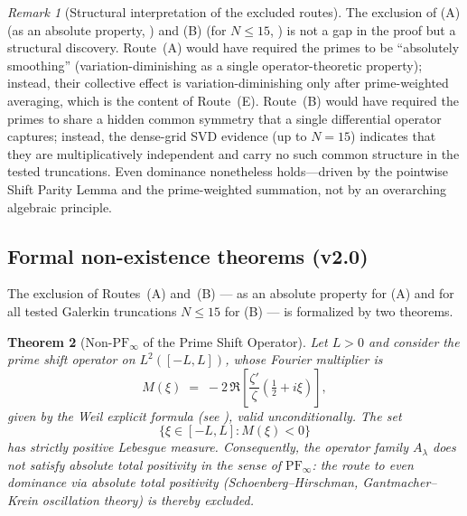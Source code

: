 \documentclass[12pt,a4paper]{article}
\newtheorem{theorem}{Theorem}[section]
\theoremstyle{definition}
\theoremstyle{remark}
\newtheorem{remark}[theorem]{Remark}
\begin{document}
\begin{remark}[Structural interpretation of the excluded routes]
The exclusion of (A) (as an absolute property, ) and (B) (for $N \leq 15$, ) is not a gap in the proof but a structural discovery. Route~(A) would have required the primes to be ``absolutely smoothing'' (variation-diminishing as a single operator-theoretic property); instead, their collective effect is variation-diminishing only after prime-weighted averaging, which is the content of Route~(E). Route~(B) would have required the primes to share a hidden common symmetry that a single differential operator captures; instead, the dense-grid SVD evidence (up to $N=15$) indicates that they are multiplicatively independent and carry no such common structure in the tested truncations. Even dominance nonetheless holds---driven by the pointwise Shift Parity Lemma and the prime-weighted summation, not by an overarching algebraic principle.
\end{remark}

\subsection{Formal non-existence theorems (v2.0)}
\label{sec:nonexistence}

The exclusion of Routes~(A) and~(B) --- as an absolute property for (A) and for all tested Galerkin truncations $N \leq 15$ for (B) --- is formalized by two theorems.

\begin{theorem}[Non-$\mathrm{PF}_\infty$ of the Prime Shift Operator]\label{thm:NE-A}
Let $L > 0$ and consider the prime shift operator on $L^2([-L,L])$, whose Fourier multiplier is
\[
  M(\xi) \;=\; -2\,\Re\!\left[\frac{\zeta'}{\zeta}\!\left(\tfrac{1}{2}+i\xi\right)\right],
\]
given by the Weil explicit formula (see \cite{Connes2026}), valid unconditionally. The set
\[
  \{\xi \in [-L,L] : M(\xi) < 0\}
\]
has strictly positive Lebesgue measure. Consequently, the operator family $A_\lambda$ does not satisfy absolute total positivity in the sense of $\mathrm{PF}_\infty$: the route to even dominance via absolute total positivity (Schoenberg--Hirschman, Gantmacher--Krein oscillation theory) is thereby excluded.
\end{theorem}
\end{document}
